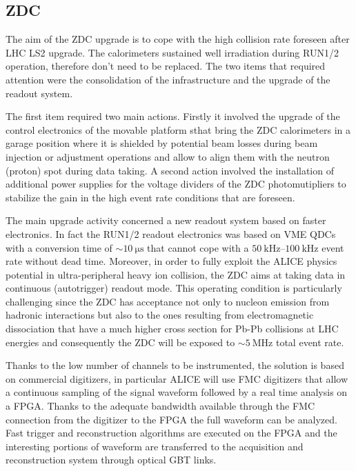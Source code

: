 \subsection{ZDC}

The aim of the ZDC upgrade is to cope with the high collision rate foreseen after LHC LS2 upgrade. The calorimeters sustained well irradiation during RUN1/2 operation, therefore don't need to be replaced. The two items that required attention were the consolidation of the infrastructure and the upgrade of the readout system.

The first item required two main actions. Firstly it involved the upgrade of the control electronics of the movable platform sthat bring the ZDC calorimeters in a garage position where it is shielded by potential beam losses during beam injection or adjustment operations and allow to align them with the neutron (proton) spot during data taking. A second action involved the installation of additional power supplies for the voltage dividers of the ZDC photomutipliers to stabilize the gain in the high event rate conditions that are foreseen. 

The main upgrade activity concerned a new readout system based on faster electronics. In fact the RUN1/2 readout electronics was based on VME QDCs with a conversion time of $\sim\SI{10}{\micro\second}$ that cannot cope with a $\SIrange[range-units=single,range-phrase=\div]{50}{100}{\kilo\hertz}$ event rate without dead time. Moreover, in order to fully exploit the ALICE physics potential in ultra-peripheral heavy ion collision, the ZDC aims at taking data in continuous (autotrigger) readout mode. This operating condition is particularly challenging since the ZDC has acceptance not only to nucleon emission from hadronic interactions but also to the ones resulting from electromagnetic dissociation \cite{Pshenichnov2001,Pshenichnov2011,ALICE:2012aa} that have a much higher cross section for Pb-Pb collisions at LHC energies and consequently the ZDC will be exposed to $\sim\SI{5}{\mega\hertz}$ total event rate.

Thanks to the low number of channels to be instrumented, the solution is based on commercial digitizers, in particular ALICE will use FMC digitizers that allow a continuous sampling of the signal waveform followed by a real time analysis on a FPGA. 
Thanks to the adequate bandwidth available through the FMC connection from the digitizer to the FPGA the full waveform can be analyzed. Fast trigger and reconstruction algorithms are executed on the FPGA and the interesting portions of waveform are transferred to the acquisition and reconstruction system through optical GBT links.

